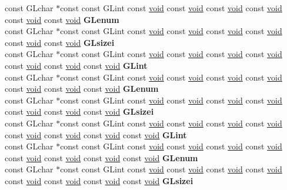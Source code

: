 \begin{DoxyCompactItemize}
\begin{tabbing}
\>const GLchar $\ast$const const GLint const \hyperlink{interfacevoid}{void} const \hyperlink{interfacevoid}{void} const \hyperlink{interfacevoid}{void} const \hyperlink{interfacevoid}{void} const \hyperlink{interfacevoid}{void} const \hyperlink{interfacevoid}{void} {\bfseries GLenum}\\
\>const GLchar $\ast$const const GLint const \hyperlink{interfacevoid}{void} const \hyperlink{interfacevoid}{void} const \hyperlink{interfacevoid}{void} const \hyperlink{interfacevoid}{void} const \hyperlink{interfacevoid}{void} const \hyperlink{interfacevoid}{void} {\bfseries GLsizei}\\
\>const GLchar $\ast$const const GLint const \hyperlink{interfacevoid}{void} const \hyperlink{interfacevoid}{void} const \hyperlink{interfacevoid}{void} const \hyperlink{interfacevoid}{void} const \hyperlink{interfacevoid}{void} const \hyperlink{interfacevoid}{void} const \hyperlink{interfacevoid}{void} {\bfseries GLint}\\
\>const GLchar $\ast$const const GLint const \hyperlink{interfacevoid}{void} const \hyperlink{interfacevoid}{void} const \hyperlink{interfacevoid}{void} const \hyperlink{interfacevoid}{void} const \hyperlink{interfacevoid}{void} const \hyperlink{interfacevoid}{void} const \hyperlink{interfacevoid}{void} {\bfseries GLenum}\\
\>const GLchar $\ast$const const GLint const \hyperlink{interfacevoid}{void} const \hyperlink{interfacevoid}{void} const \hyperlink{interfacevoid}{void} const \hyperlink{interfacevoid}{void} const \hyperlink{interfacevoid}{void} const \hyperlink{interfacevoid}{void} const \hyperlink{interfacevoid}{void} {\bfseries GLsizei}\\
\>const GLchar $\ast$const const GLint const \hyperlink{interfacevoid}{void} const \hyperlink{interfacevoid}{void} const \hyperlink{interfacevoid}{void} const \hyperlink{interfacevoid}{void} const \hyperlink{interfacevoid}{void} const \hyperlink{interfacevoid}{void} const \hyperlink{interfacevoid}{void} const \hyperlink{interfacevoid}{void} {\bfseries GLint}\\
\>const GLchar $\ast$const const GLint const \hyperlink{interfacevoid}{void} const \hyperlink{interfacevoid}{void} const \hyperlink{interfacevoid}{void} const \hyperlink{interfacevoid}{void} const \hyperlink{interfacevoid}{void} const \hyperlink{interfacevoid}{void} const \hyperlink{interfacevoid}{void} const \hyperlink{interfacevoid}{void} {\bfseries GLenum}\\
\>const GLchar $\ast$const const GLint const \hyperlink{interfacevoid}{void} const \hyperlink{interfacevoid}{void} const \hyperlink{interfacevoid}{void} const \hyperlink{interfacevoid}{void} const \hyperlink{interfacevoid}{void} const \hyperlink{interfacevoid}{void} const \hyperlink{interfacevoid}{void} const \hyperlink{interfacevoid}{void} {\bfseries GLsizei}\\

\end{tabbing}
\end{DoxyCompactItemize}
